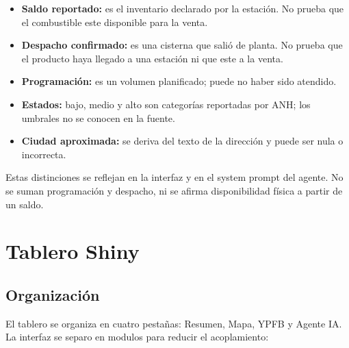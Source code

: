 \documentclass[12pt,a4paper]{article}
\begin{document}
\begin{itemize}[leftmargin=1.2cm]
  \item \textbf{Saldo reportado:} es el inventario declarado por la estación. No prueba que el combustible este disponible para la venta.
  \item \textbf{Despacho confirmado:} es una cisterna que salió de planta. No prueba que el producto haya llegado a una estación ni que este a la venta.
  \item \textbf{Programación:} es un volumen planificado; puede no haber sido atendido.
  \item \textbf{Estados:} bajo, medio y alto son categorías reportadas por ANH; los umbrales no se conocen en la fuente.
  \item \textbf{Ciudad aproximada:} se deriva del texto de la dirección y puede ser nula o incorrecta.
\end{itemize}

Estas distinciones se reflejan en la interfaz y en el system prompt del agente. No se suman programación y despacho, ni se afirma disponibilidad física a partir de un saldo.

\section{Tablero Shiny}\label{sec:dashboard}

\subsection{Organización}

El tablero se organiza en cuatro pestañas: Resumen, Mapa, YPFB y Agente IA. La interfaz se separo en modulos para reducir el acoplamiento:
\end{document}
